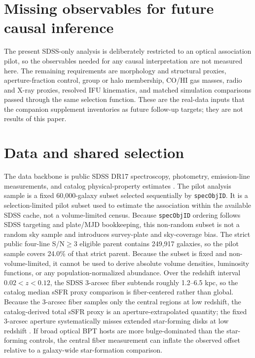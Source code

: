 \documentclass[twocolumn]{aastex631}
\begin{document}
\section{Missing observables for future causal inference}
The present SDSS-only analysis is deliberately restricted to an optical association pilot, so the observables needed for any causal interpretation are not measured here. The remaining requirements are morphology and structural proxies, aperture-fraction control, group or halo membership, CO/HI gas masses, radio and X-ray proxies, resolved IFU kinematics, and matched simulation comparisons passed through the same selection function. These are the real-data inputs that the companion supplement inventories as future follow-up targets; they are not results of this paper.

\section{Data and shared selection}
The data backbone is public SDSS DR17 spectroscopy, photometry, emission-line measurements, and catalog physical-property estimates \citep{york2000,sdssdr17,brinchmann2004}. The pilot analysis sample is a fixed 60,000-galaxy subset selected sequentially by \texttt{specObjID}. It is a selection-limited pilot subset used to estimate the association within the available SDSS cache, not a volume-limited census. Because \texttt{specObjID} ordering follows SDSS targeting and plate/MJD bookkeeping, this non-random subset is not a random sky sample and introduces survey-plate and sky-coverage bias. The strict public four-line S/N$\geq3$ eligible parent contains 249,917 galaxies, so the pilot sample covers 24.0\% of that strict parent. Because the subset is fixed and non-volume-limited, it cannot be used to derive absolute volume densities, luminosity functions, or any population-normalized abundance.
Over the redshift interval $0.02<z<0.12$, the SDSS 3-arcsec fiber subtends roughly 1.2--6.5 kpc, so the catalog median sSFR proxy comparison is fiber-centered rather than global.
Because the 3-arcsec fiber samples only the central regions at low redshift, the catalog-derived total sSFR proxy is an aperture-extrapolated quantity; the fixed 3-arcsec aperture systematically misses extended star-forming disks at low redshift \citep{kewley2005}. If broad optical BPT hosts are more bulge-dominated than the star-forming controls, the central fiber measurement can inflate the observed offset relative to a galaxy-wide star-formation comparison.
\end{document}
